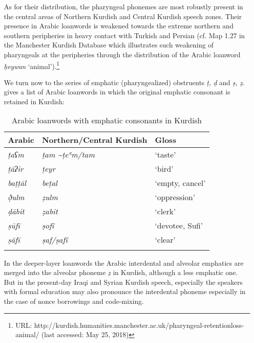 \documentclass[output=paper]{langsci/langscibook}
\begin{document}
As for their distribution, the pharyngeal phonemes are most robustly present in the central areas of Northern Kurdish and Central Kurdish speech zones. Their presence in Arabic loanwords is weakened towards the extreme northern and southern peripheries in heavy contact with Turkish and Persian (cf. Map 1.27 in the Manchester Kurdish Database which illustrates such weakening of pharyngeals at the peripheries through the distribution of the Arabic loanword \textit{ḥeywan} ‘animal’).\footnote{URL: http://kurdish.humanities.manchester.ac.uk/pharyngeal-retentionloss-animal/ (last accessed: May 25, 2018)}

We turn now to the series of emphatic (pharyngealized) obstruents \textit{ṭ, ḍ} and \textit{ṣ, ẓ}.  gives a list of Arabic loanwords in which the original emphatic consonant is retained in Kurdish: 

\begin{table}
\begin{tabular}{lll}
\lsptoprule
Arabic & Northern/Central Kurdish & Gloss\\\midrule
\textit{ṭaʕm}   & \textit{ṭam \textasciitilde ṭeʿm\slash tam} & ‘taste’\\ 
\textit{ṭāʔir}  & \textit{ṭeyr}                               & ‘bird’\\ 
\textit{baṭṭāl} & \textit{beṭal}                              & ‘empty, cancel’\\ 
\textit{ð̣ulm}  & \textit{ẓulm}                               & ‘oppression’\\ 
\textit{ḍābit}  & \textit{ẓabit}                              & ‘clerk’\\ 
\textit{ṣūfī}   & \textit{ṣofî}                               & ‘devotee, Sufi’\\ 
\textit{ṣāfī}   & \textit{ṣaf/ṣafî}                           & ‘clear’\\
\lspbottomrule
\end{tabular}
\caption{Arabic loanwords with emphatic consonants in Kurdish\label{tab:opengin:5}}
\end{table}

In the deeper-layer loanwords the Arabic interdental and alveolar emphatics are merged into the alveolar phoneme \textit{ẓ} in Kurdish, although a less emphatic one. But in the present-day Iraqi and Syrian Kurdish speech, especially the speakers with formal education may also pronounce the interdental phoneme especially in the case of nonce borrowings and code-mixing.  
\end{document}
